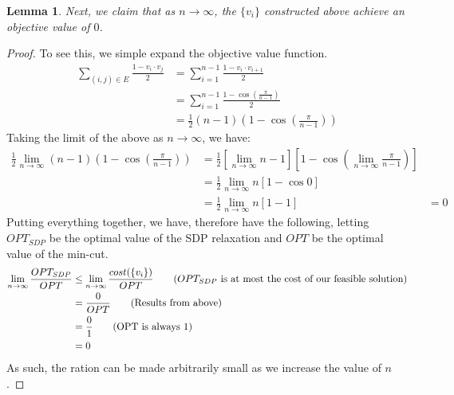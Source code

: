\documentclass[12pt]{exam}
\newtheorem{lemma}[theorem]{Lemma}
\begin{document}
\begin{questions}
\begin{solution}
\begin{enumerate}[label=(\alph*)]
    \begin{lemma}
      Next, we claim that as $n \to \infty$, the $\{v_i\}$ constructed above achieve an objective value of $0$.
    \end{lemma}
    \begin{proof}
      To see this, we simple expand the objective value function.
      \begin{align*}
        \sum_{(i,j) \in E} \frac{1 - v_i \cdot v_j}{2} &= \sum_{i=1}^{n-1} \frac{1 - v_{i}\cdot v_{i+1}}{2} \tag{By construction of $G$} \\
        &= \sum_{i=1}^{n-1} \frac{1 - \cos \left(\frac{\pi}{n-1} \right)}{2} \tag{By construction of $v_i$} \\
        &= \frac{1}{2}(n-1)(1 - \cos \left(\frac{\pi}{n-1} \right)) \tag{Simplifying}
      \end{align*}
      Taking the limit of the above as $n \to \infty$, we have:
      \begin{align*}
        \frac{1}{2} \lim_{n \to \infty} (n-1)(1 - \cos \left(\frac{\pi}{n-1} \right)) &= \frac{1}{2} \left[ \lim_{n \to \infty} n - 1\right] \left[ 1- \cos \left( \lim_{n \to \infty} \frac{\pi}{n-1} \right) \right] \\
        &= \frac{1}{2} \lim_{n \to \infty} n [1 - \cos 0] \\ 
        &= \frac{1}{2} \lim_{n \to \infty} n [1 - 1]
        &= 0
      \end{align*}
      Putting everything together, we have, therefore have the following, letting $OPT_{SDP}$ be the optimal value of the SDP relaxation and $OPT$ be the optimal value of the min-cut.
      \begin{align*}
        \lim_{n \to \infty} \frac{OPT_{SDP}}{OPT} &\leq \lim_{n \to \infty}\frac{cost(\{v_i\})}{OPT} \tag{$OPT_{SDP}$ is at most the cost of our feasible solution} \\
        &= \frac{0}{OPT} \tag{Results from above} \\
        &= \frac{0}{1} \tag{OPT is always $1$} \\
        &= 0
      \end{align*}
      As such, the ration can be made arbitrarily small as we increase the value of $n$.
    \end{proof}
  \end{enumerate}
\end{solution}



\end{questions}
\end{document}
